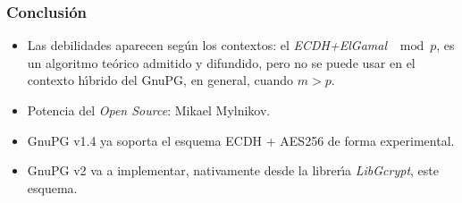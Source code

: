 \documentclass{beamer}
\theoremstyle{plain}        			%
\theoremstyle{definition}   			%
\theoremstyle{saltolinea}   			%
\begin{document}
\begin{frame}
\frametitle{Conclusi\'on}
	\pause
	\begin{itemize}[<+-| alert@+>]
		\item Las debilidades aparecen seg\'un los contextos: el \emph{ECDH+ElGamal} $\mod p$, es un algoritmo te\'orico admitido y difundido, pero no se puede usar en el contexto h\'{\i}brido del GnuPG, en general, cuando $m>p$.
		\item Potencia del \emph{Open Source}: Mikael Mylnikov.
		\item GnuPG v1.4 ya soporta el esquema ECDH + AES256 de forma experimental.
		\item GnuPG v2 va a implementar, nativamente desde la librer\'{\i}a \emph{LibGcrypt}, este esquema.
	\end{itemize}
\end{frame}
\end{document}
